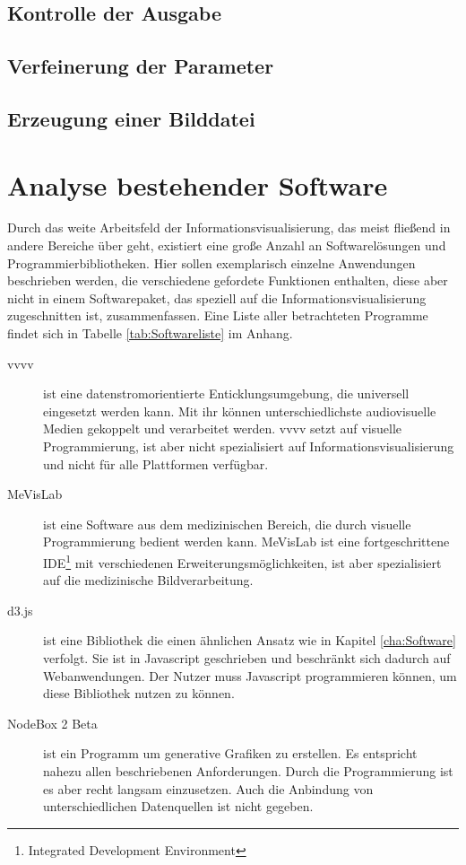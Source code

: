 \documentclass[a4paper, 12pt, DIV=calc, version=first, pdftex, headsepline, footsepline, bibtotocnumbered, liststotocnumbered]{scrreprt}
\begin{document}
\subsection{Kontrolle der Ausgabe}
\subsection{Verfeinerung der Parameter}
\subsection{Erzeugung einer Bilddatei}

\section{Analyse bestehender Software}
\label{sec:bestehendeSoftware}
Durch das weite Arbeitsfeld der Informationsvisualisierung, das meist
fließend in andere Bereiche über geht, existiert eine große Anzahl an
Softwarelösungen und Programmierbibliotheken. Hier sollen exemplarisch
einzelne Anwendungen beschrieben werden, die verschiedene gefordete
Funktionen enthalten, diese aber nicht in einem Softwarepaket, das
speziell auf die Informationsvisualisierung zugeschnitten ist, zusammenfassen.
Eine Liste aller betrachteten Programme findet sich in Tabelle
\ref{tab:Softwareliste} im Anhang.
\begin{description}
\item[vvvv]
ist eine datenstromorientierte Enticklungsumgebung, die universell eingesetzt werden kann.
Mit ihr können unterschiedlichste audiovisuelle Medien gekoppelt und
verarbeitet werden. vvvv setzt auf visuelle Programmierung, ist aber
nicht spezialisiert auf Informationsvisualisierung und nicht für alle
Plattformen verfügbar.
\item[MeVisLab]
ist eine Software aus dem medizinischen Bereich, die durch visuelle
Programmierung bedient werden kann. MeVisLab ist eine fortgeschrittene
IDE\footnote{Integrated Development Environment} mit verschiedenen
Erweiterungsmöglichkeiten, ist aber spezialisiert auf die medizinische
Bildverarbeitung.
\item[d3.js]
ist eine Bibliothek die einen ähnlichen Ansatz wie in Kapitel \ref{cha:Software}
verfolgt. Sie ist in Javascript geschrieben und beschränkt sich dadurch auf
Webanwendungen. Der Nutzer muss Javascript programmieren können, um diese
Bibliothek nutzen zu können.
\item[NodeBox 2 Beta]
ist ein Programm um generative Grafiken zu erstellen. Es entspricht nahezu
allen beschriebenen Anforderungen. Durch die Programmierung ist es aber recht
langsam einzusetzen. Auch die Anbindung von unterschiedlichen Datenquellen
ist nicht gegeben.
\end{description}
\end{document}
